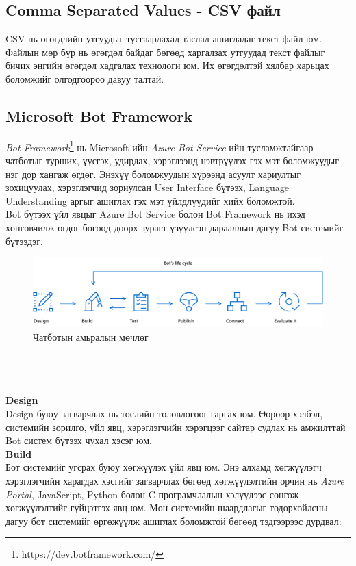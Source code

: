 \subsection{Comma Separated Values - CSV файл}
CSV нь өгөгдлийн утгуудыг тусгаарлахад таслал ашигладаг текст файл юм. Файлын мөр бүр нь өгөгдөл байдаг бөгөөд харгалзах утгуудад текст файлыг бичих энгийн өгөгдөл хадгалах технологи юм. Их өгөгдөлтэй хялбар харьцах боломжийг олгодгоороо давуу талтай.
\subsection{Microsoft Bot Framework}
\textit{Bot Framework}\footnote{https://dev.botframework.com/} нь Microsoft-ийн \textit{Azure Bot Service}-ийн тусламжтайгаар чатботыг турших, үүсгэх, удирдах, хэрэглээнд нэвтрүүлэх гэх мэт боломжуудыг нэг дор хангаж өгдөг. Энэхүү боломжуудын хүрээнд асуулт хариултыг зохицуулах, хэрэглэгчид зориулсан User Interface бүтээх, Language Understanding аргыг ашиглах гэх мэт үйлдлүүдийг хийх боломжтой.
\\Bot бүтээх үйл явцыг Azure Bot Service болон Bot Framework нь ихэд хөнгөвчилж өгдөг бөгөөд доорх зурагт үзүүлсэн дарааллын дагуу Bot системийг бүтээдэг.
\begin{figure}[h]
  \includegraphics*[width=\textwidth]{images/azureSteps.png}
  \caption{Чатботын амьралын мөчлөг}
\end{figure}
\\\\\\\textbf{Design}
\\Design буюу загварчлах нь төслийн төлөвлөгөөг гаргах юм. Өөрөөр хэлбэл, системийн зорилго, үйл явц, хэрэглэгчийн хэрэгцээг сайтар судлах нь амжилттай Bot систем бүтээх чухал хэсэг юм.
\\\textbf{Build}
\\Бот системийг угсрах буюу хөгжүүлэх үйл явц юм. Энэ алхамд хөгжүүлэгч хэрэглэгчийн харагдах хэсгийг загварчлах бөгөөд хөгжүүлэлтийн орчин нь \textit{Azure Portal}, JavaScript, Python болон C програмчлалын хэлүүдээс сонгож хөгжүүлэлтийг гүйцэтгэх явц юм. Мөн системийн шаардлагыг тодорхойлсны дагуу бот системийг өргөжүүлж ашиглах боломжтой бөгөөд тэдгээрээс дурдвал:
